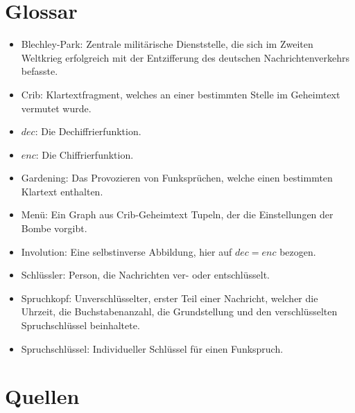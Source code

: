 \documentclass[ngerman, a4paper, footsepline, headsepline]{scrreport}
\begin{document}
	\chapter{Glossar}
	\begin{itemize}
		\item Blechley-Park: Zentrale militärische Dienststelle, die sich im Zweiten Weltkrieg erfolgreich mit der Entzifferung des deutschen Nachrichtenverkehrs befasste.
		\item Crib: Klartextfragment, welches an einer bestimmten Stelle im Geheimtext vermutet wurde.
		\item $dec$: Die Dechiffrierfunktion.
		\item $enc$: Die Chiffrierfunktion.
		\item Gardening: Das Provozieren von Funksprüchen, welche einen bestimmten Klartext enthalten.
		\item Menü: Ein Graph aus Crib-Geheimtext Tupeln, der die Einstellungen der Bombe vorgibt.
		\item Involution: Eine selbstinverse Abbildung, hier auf $dec = enc$ bezogen.
		\item Schlüssler: Person, die Nachrichten ver- oder entschlüsselt.
		\item Spruchkopf: Unverschlüsselter, erster Teil einer Nachricht, welcher die Uhrzeit, die Buchstabenanzahl, die Grundstellung und den verschlüsselten Spruchschlüssel beinhaltete.
		\item Spruchschlüssel:  Individueller Schlüssel für einen Funkspruch.
	\end{itemize}
	
	\chapter{Quellen}
	\printbibliography[heading=none, title={}]
	\nocite{*}
	\thispagestyle{plain}
	
	
	
	
	
	
\end{document}
